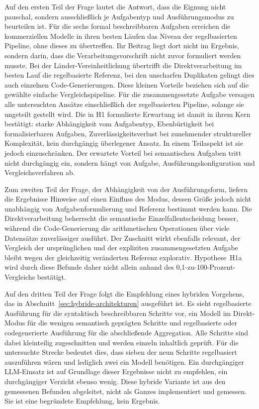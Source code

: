 Auf den ersten Teil der Frage lautet die Antwort, dass die Eignung nicht pauschal, sondern ausschließlich je Aufgabentyp und Ausführungsmodus zu beurteilen ist. Für die sechs formal beschreibbaren Aufgaben erreichen die kommerziellen Modelle in ihren besten Läufen das Niveau der regelbasierten Pipeline, ohne dieses zu übertreffen. Ihr Beitrag liegt dort nicht im Ergebnis, sondern darin, dass die Verarbeitungsvorschrift nicht zuvor formuliert werden musste. Bei der Länder-Vereinheitlichung übertrifft die Direktverarbeitung im besten Lauf die regelbasierte Referenz, bei den unscharfen Duplikaten gelingt dies auch einzelnen Code-Generierungen. Diese kleinen Vorteile beziehen sich auf die gewählte einfache Vergleichspipeline. Für die zusammengesetzte Aufgabe versagen alle untersuchten Ansätze einschließlich der regelbasierten Pipeline, solange sie ungeteilt gestellt wird. Die in H1 formulierte Erwartung ist damit in ihrem Kern bestätigt: starke Abhängigkeit vom Aufgabentyp, Ebenbürtigkeit bei formalisierbaren Aufgaben, Zuverlässigkeitsverlust bei zunehmender struktureller Komplexität, kein durchgängig überlegener Ansatz. In einem Teilaspekt ist sie jedoch einzuschränken. Der erwartete Vorteil bei semantischen Aufgaben tritt nicht durchgängig ein, sondern hängt von Aufgabe, Ausführungskonfiguration und Vergleichsverfahren ab.

Zum zweiten Teil der Frage, der Abhängigkeit von der Ausführungsform, liefern die Ergebnisse Hinweise auf einen Einfluss des Modus, dessen Größe jedoch nicht unabhängig von Aufgabenformulierung und Referenz bestimmt werden kann. Die Direktverarbeitung beherrscht die semantische Einzelfallentscheidung besser, während die Code-Generierung die arithmetischen Operationen über viele Datensätze zuverlässiger ausführt. Der Zuschnitt wirkt ebenfalls relevant, der Vergleich der ursprünglichen und der expliziten zusammengesetzten Aufgabe bleibt wegen der gleichzeitig veränderten Referenz explorativ. Hypothese~H1a wird durch diese Befunde daher nicht allein anhand des 0,1-zu-100-Prozent-Vergleichs bestätigt.

Auf den dritten Teil der Frage folgt die Empfehlung eines hybriden Vorgehens, das in Abschnitt~\ref{sec:hybride-architekturen} ausgeführt ist. Es sieht regelbasierte Ausführung für die syntaktisch beschreibbaren Schritte vor, ein Modell im Direkt-Modus für die wenigen semantisch geprägten Schritte und regelbasierte oder codegenerierte Ausführung für die abschließende Aggregation. Alle Schritte sind dabei kleinteilig zugeschnitten und werden einzeln inhaltlich geprüft. Für die untersuchte Strecke bedeutet dies, dass sieben der neun Schritte regelbasiert auszuführen wären und lediglich zwei ein Modell benötigen. Ein durchgängiger \ac{LLM}-Einsatz ist auf Grundlage dieser Ergebnisse nicht zu empfehlen, ein durchgängiger Verzicht ebenso wenig. Diese hybride Variante ist aus den gemessenen Befunden abgeleitet, nicht als Ganzes implementiert und gemessen. Sie ist eine begründete Empfehlung, kein Ergebnis.

